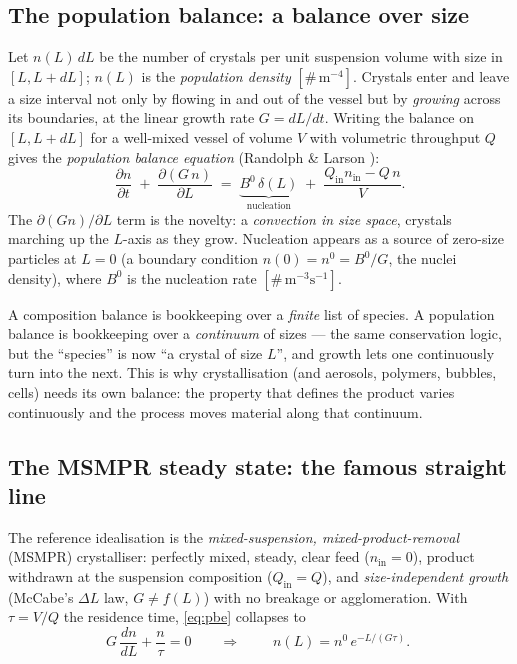 \documentclass[11pt,a4paper]{article}
\begin{document}
\subsection{The population balance: a balance over size}

Let $n(L)\,dL$ be the number of crystals per unit suspension volume
with size in $[L, L+dL]$; $n(L)$ is the \emph{population density}
$[\#\,\mathrm{m^{-4}}]$.  Crystals enter and leave a size interval not
only by flowing in and out of the vessel but by \emph{growing} across
its boundaries, at the linear growth rate $G = dL/dt$.  Writing the
balance on $[L, L+dL]$ for a well-mixed vessel of volume $V$ with
volumetric throughput $Q$ gives the \emph{population balance equation}
(Randolph \& Larson \cite{RandolphLarson}):
\begin{equation}
   \frac{\partial n}{\partial t}
   \;+\; \frac{\partial (G\,n)}{\partial L}
   \;=\; \underbrace{B^0\,\delta(L)}_{\text{nucleation}}
   \;+\; \frac{Q_{\text{in}} n_{\text{in}} - Q\,n}{V}.
   \label{eq:pbe}
\end{equation}
The $\partial(Gn)/\partial L$ term is the novelty: a \emph{convection
in size space}, crystals marching up the $L$-axis as they grow.
Nucleation appears as a source of zero-size particles at $L=0$ (a
boundary condition $n(0)=n^0=B^0/G$, the nuclei density), where $B^0$
is the nucleation rate $[\#\,\mathrm{m^{-3}s^{-1}}]$.

\begin{intuition}
A composition balance is bookkeeping over a \emph{finite} list of
species.  A population balance is bookkeeping over a \emph{continuum}
of sizes --- the same conservation logic, but the ``species'' is now
``a crystal of size $L$'', and growth lets one continuously turn into
the next.  This is why crystallisation (and aerosols, polymers,
bubbles, cells) needs its own balance: the property that defines the
product varies continuously and the process moves material along that
continuum.
\end{intuition}

\subsection{The MSMPR steady state: the famous straight line}

The reference idealisation is the \emph{mixed-suspension,
mixed-product-removal} (MSMPR) crystalliser: perfectly mixed, steady,
clear feed ($n_{\text{in}}=0$), product withdrawn at the suspension
composition ($Q_{\text{in}}=Q$), and \emph{size-independent growth}
(McCabe's $\Delta L$ law, $G\neq f(L)$) with no breakage or
agglomeration.  With $\tau=V/Q$ the residence time,
\eqref{eq:pbe} collapses to
\begin{equation}
   G\,\frac{dn}{dL} + \frac{n}{\tau} = 0
   \qquad\Longrightarrow\qquad
   \boxed{\;n(L) = n^0\,e^{-L/(G\tau)}.\;}
   \label{eq:msmpr-n}
\end{equation}
\end{document}
